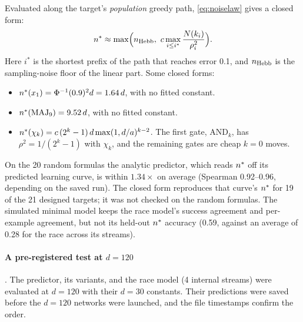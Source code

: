 Evaluated along the target's \emph{population} greedy path, \eqref{eq:noiselaw} gives a closed form:
\[
\nstar\approx\max\Bigl(n_{\rm Hebb},\ c\max_{i\le i^*}\frac{N(k_i)}{\rho_i^2}\Bigr).
\]
Here $i^*$ is the shortest prefix of the path that reaches error 0.1, and $n_{\rm Hebb}$ is the sampling-noise floor of the linear part. Some closed forms:
\begin{itemize}
\item $n^{*}(x_1)=\Phi^{-1}(0.9)^2d=1.64\,d$, with no fitted constant.
\item $n^{*}(\mathrm{MAJ}_9)=9.52\,d$, with no fitted constant.
\item $n^{*}(\chi_k)=c\,(2^k-1)\,d\max(1,d/a)^{k-2}$. The first gate, AND$_k$, has $\rho^2=1/(2^k-1)$ with $\chi_k$, and the remaining gates are cheap $k=0$ moves.
\end{itemize}
On the 20 random formulas the analytic predictor, which reads $n^{*}$ off its predicted learning curve, is within $1.34\times$ on average (Spearman 0.92–0.96, depending on the saved run). The closed form reproduces that curve's $n^{*}$ for 19 of the 21 designed targets; it was not checked on the random formulas. The simulated minimal model keeps the race model's success agreement and per-example agreement, but not its held-out $n^{*}$ accuracy (0.59, against an average of 0.28 for the race across its streams).

\paragraph{A pre-registered test at $d=120$} . The predictor, its variants, and the race model (4 internal streams) were evaluated at $d=120$ with their $d=30$ constants. Their predictions were saved before the $d=120$ networks were launched, and the file timestamps confirm the order.

